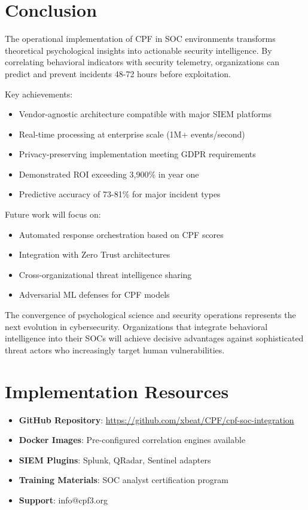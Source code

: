 \documentclass[11pt,a4paper]{article}
\begin{document}
\section{Conclusion}

The operational implementation of CPF in SOC environments transforms theoretical psychological insights into actionable security intelligence. By correlating behavioral indicators with security telemetry, organizations can predict and prevent incidents 48-72 hours before exploitation.

Key achievements:
\begin{itemize}
\item Vendor-agnostic architecture compatible with major SIEM platforms
\item Real-time processing at enterprise scale (1M+ events/second)
\item Privacy-preserving implementation meeting GDPR requirements
\item Demonstrated ROI exceeding 3,900\% in year one
\item Predictive accuracy of 73-81\% for major incident types
\end{itemize}

Future work will focus on:
\begin{itemize}
\item Automated response orchestration based on CPF scores
\item Integration with Zero Trust architectures
\item Cross-organizational threat intelligence sharing
\item Adversarial ML defenses for CPF models
\end{itemize}

The convergence of psychological science and security operations represents the next evolution in cybersecurity. Organizations that integrate behavioral intelligence into their SOCs will achieve decisive advantages against sophisticated threat actors who increasingly target human vulnerabilities.

\section*{Implementation Resources}

\begin{itemize}
\item \textbf{GitHub Repository}: \url{https://github.com/xbeat/CPF/cpf-soc-integration}
\item \textbf{Docker Images}: Pre-configured correlation engines available
\item \textbf{SIEM Plugins}: Splunk, QRadar, Sentinel adapters
\item \textbf{Training Materials}: SOC analyst certification program
\item \textbf{Support}: info@cpf3.org
\end{itemize}
\end{document}
